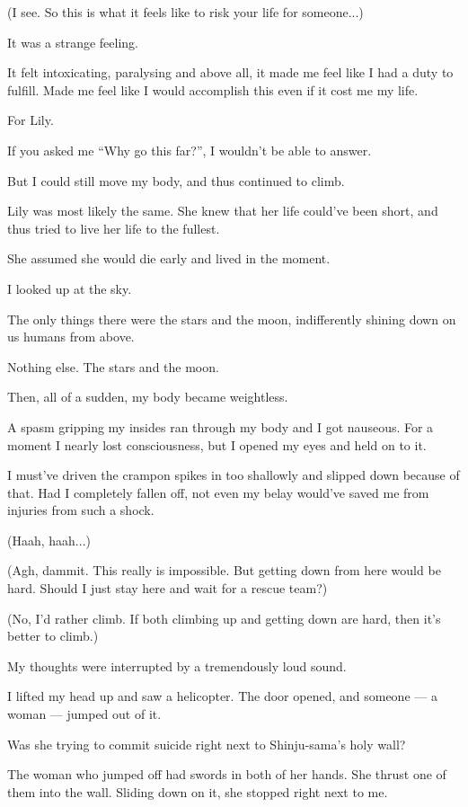 (I see. So this is what it feels like to risk your life for someone...)

It was a strange feeling.

It felt intoxicating, paralysing and above all, it made me feel like I had a duty to fulfill. Made me feel like I would accomplish this even if it cost me my life.

For Lily.

If you asked me ``Why go this far?'', I wouldn't be able to answer.

But I could still move my body, and thus continued to climb.

Lily was most likely the same. She knew that her life could've been short, and thus tried to live her life to the fullest.

She assumed she would die early and lived in the moment.

I looked up at the sky.

The only things there were the stars and the moon, indifferently shining down on us humans from above.

Nothing else. The stars and the moon.

Then, all of a sudden, my body became weightless.

A spasm gripping my insides ran through my body and I got nauseous. For a moment I nearly lost consciousness, but I opened my eyes and held on to it.

I must've driven the crampon spikes in too shallowly and slipped down because of that. Had I completely fallen off, not even my belay would've saved me from injuries from such a shock.

(Haah, haah...)

(Agh, dammit. This really is impossible. But getting down from here would be hard. Should I just stay here and wait for a rescue team?)

(No, I'd rather climb. If both climbing up and getting down are hard, then it's better to climb.)

My thoughts were interrupted by a tremendously loud sound.

I lifted my head up and saw a helicopter. The door opened, and someone --- a woman --- jumped out of it.

Was she trying to commit suicide right next to Shinju-sama's holy wall?

The woman who jumped off had swords in both of her hands. She thrust one of them into the wall. Sliding down on it, she stopped right next to me.

